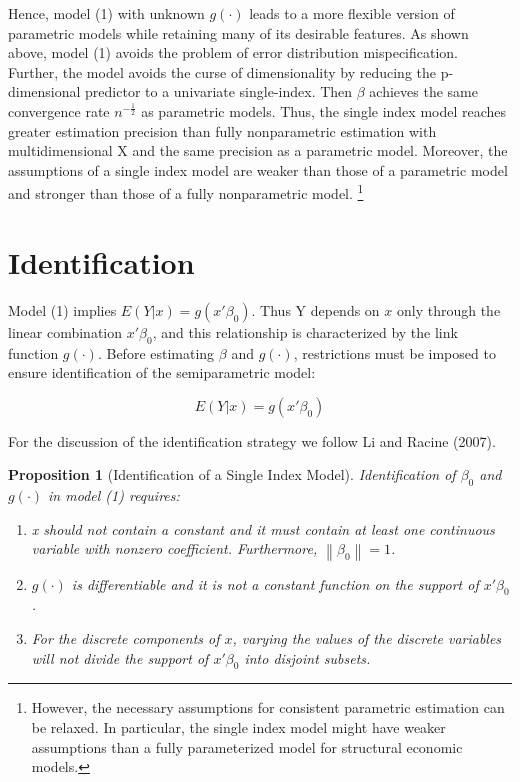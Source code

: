 \documentclass[a4paper]{article}
\newcommand{\norm}[1]{\left\lVert#1\right\rVert}
\begin{document}
Hence, model (1) with unknown $g(\cdot)$ leads to a more flexible version of parametric models while retaining many of its desirable features. As shown above, model (1) avoids the problem of error distribution mispecification. Further, the model avoids the curse of dimensionality by reducing the p-dimensional predictor to a univariate single-index. Then $\beta$ achieves the same convergence rate $n^{-\frac{1}{2}}$ as parametric models. Thus, the single index model reaches greater estimation precision than fully nonparametric estimation with multidimensional X and the same precision as a parametric model. Moreover, the assumptions of a single index model are weaker than those of a parametric model and stronger than those of a fully nonparametric model.  \footnote{However, the necessary assumptions for consistent parametric estimation can be relaxed. In particular, the single index model might have weaker assumptions than a fully parameterized model for structural economic models.} %


\section{Identification} %
\label{sec:Identification}

Model (1) implies $E(Y|x) = g(x'\beta_0)$. Thus Y depends on $x$ only through the linear combination $x'\beta_0$, and this relationship is characterized by the link function $g(\cdot)$. Before estimating  $\beta$ and $ g(\cdot)$, restrictions must be imposed to ensure identification of the semiparametric model:

\begin{equation}
E(Y|x) = g(x'\beta_0)
\end{equation}


\vspace{2mm} 

For the discussion of the identification strategy we follow Li and Racine (2007).


\newtheorem{prop}{Proposition}[section]

\begin{prop}[Identification of a Single Index Model] 
Identification of $\beta_0$ and $g(\cdot)$ in model (1) requires:
\begin{enumerate}[label=(\roman*)]
\item x should not contain a constant and it must contain at least one continuous variable with nonzero coefficient. Furthermore, $\norm{ \beta_0} = 1$. %
\item $g(\cdot)$ is differentiable and it is not a constant function on the support of $x'\beta_0$.
\item For the discrete components of $x$, varying the values of the discrete variables will not divide the support of $x'\beta_0$ into disjoint subsets.
\end{enumerate}
\end{prop}
\end{document}
